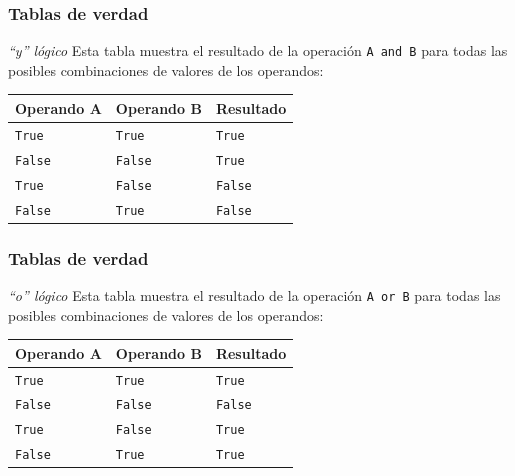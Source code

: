 \documentclass{beamer}
\begin{document}
\begin{frame}[fragile]
    \frametitle{Tablas de verdad}
    \begin{block}{{\em ``y'' lógico}}
        Esta tabla muestra el resultado de la operación \texttt{A and B} para todas las posibles combinaciones de valores de los operandos:
        \begin{center}
            \begin{table}[]
                \begin{tabular}{@{}lll@{}}
                \toprule
                 Operando A & Operando B & Resultado  \\ \midrule
                 \texttt{True} & \texttt{True} &  \texttt{True}  \\
                 \texttt{False} & \texttt{False} &  \texttt{True}  \\
                 \texttt{True} & \texttt{False} &  \texttt{False}  \\
                 \texttt{False} & \texttt{True} &  \texttt{False}  \\
                 \bottomrule
                \end{tabular}
            \end{table}
        \end{center}
    \end{block}
    \end{frame}

\begin{frame}[fragile]
    \frametitle{Tablas de verdad}
    \begin{block}{{\em ``o'' lógico}}
        Esta tabla muestra el resultado de la operación \texttt{A or B} para todas las posibles combinaciones de valores de los operandos:
        \begin{center}
            \begin{table}[]
                \begin{tabular}{@{}lll@{}}
                \toprule
                 Operando A & Operando B & Resultado  \\ \midrule
                 \texttt{True} & \texttt{True} &  \texttt{True}  \\
                 \texttt{False} & \texttt{False} &  \texttt{False}  \\
                 \texttt{True} & \texttt{False} &  \texttt{True}  \\
                 \texttt{False} & \texttt{True} &  \texttt{True}  \\
                 \bottomrule
                \end{tabular}
            \end{table}
        \end{center}
    \end{block}
    \end{frame}
\end{document}
